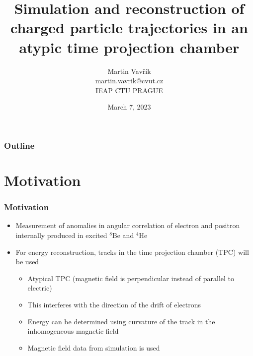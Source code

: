 \documentclass{beamer}
\title[Atypic TPC track simul. \& reconstruction]{Simulation and reconstruction of charged particle trajectories in an atypic time projection chamber}
\author[M.~Vavřík]{\foreignlanguage{czech}{Martin Vavřík}\vspace{0.5cm}\\martin.vavrik@cvut.cz\\IEAP CTU PRAGUE\\}
\date{March 7, 2023}
\begin{document}
	
	\begin{frame}
		\titlepage
	\end{frame}
	
	\begin{frame}
		\frametitle{Outline}
		\tableofcontents
	\end{frame}
	
	\section{Motivation}
	\begin{frame}
		\frametitle{Motivation}
		\begin{itemize}
			\item Measurement of anomalies in angular correlation of electron and positron internally produced in excited $ {}^8\text{Be} $ and $ {}^4\text{He} $
			\item For energy reconstruction, tracks in the time projection chamber (TPC) will be used
				\begin{itemize}
					\item Atypical TPC (magnetic field is perpendicular instead of parallel to electric)
					\item This interferes with the direction of the drift of electrons
					\item Energy can be determined using curvature of the track in the inhomogeneous magnetic field
					\item Magnetic field data from simulation is used
				\end{itemize}
		\end{itemize}
	\end{frame}
\end{document}
